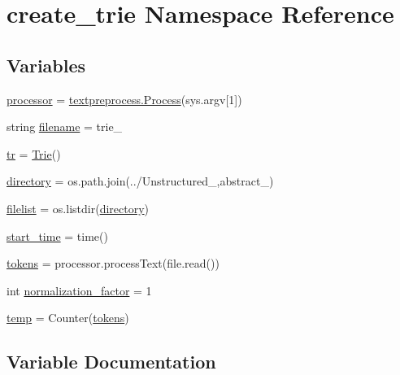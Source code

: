 \hypertarget{namespacecreate__trie}{}\section{create\+\_\+trie Namespace Reference}
\label{namespacecreate__trie}
\subsection*{Variables}
\begin{DoxyCompactItemize}
\item 
\hyperlink{namespacecreate__trie_a9338168a517e921ea77908dc05081b08}{processor} = \hyperlink{classtextpreprocess_1_1_process}{textpreprocess.\+Process}(sys.\+argv\mbox{[}1\mbox{]})
\item 
string \hyperlink{namespacecreate__trie_a430ef8eaeeaf47147c83447c0a4126bc}{filename} = \textquotesingle{}trie\+\_\+\textquotesingle{}
\item 
\hyperlink{namespacecreate__trie_a41f1ff7b2420aeb95360264a00701e6c}{tr} = \hyperlink{classtrie_1_1_trie}{Trie}()
\item 
\hyperlink{namespacecreate__trie_ad979a10ba749c867088265cbcb65e168}{directory} = os.\+path.\+join(\textquotesingle{}../Unstructured\+\_\+\textquotesingle{},\textquotesingle{}abstract\+\_\+\textquotesingle{})
\item 
\hyperlink{namespacecreate__trie_ad27168f07283984f7da7afcb2cb9c7fa}{filelist} = os.\+listdir(\hyperlink{namespacecreate__trie_ad979a10ba749c867088265cbcb65e168}{directory})
\item 
\hyperlink{namespacecreate__trie_a16d2378d2d7fd59088a9721ad77da106}{start\+\_\+time} = time()
\item 
\hyperlink{namespacecreate__trie_a37f17bf189828d28800bf79f7cb9b9a9}{tokens} = processor.\+process\+Text(file.\+read())
\item 
int \hyperlink{namespacecreate__trie_a17ca012774362c641290dcc4ed707618}{normalization\+\_\+factor} = 1
\item 
\hyperlink{namespacecreate__trie_a1cfb0e74650de85b305af8d0471c199e}{temp} = Counter(\hyperlink{namespacecreate__trie_a37f17bf189828d28800bf79f7cb9b9a9}{tokens})
\end{DoxyCompactItemize}


\subsection{Variable Documentation}
